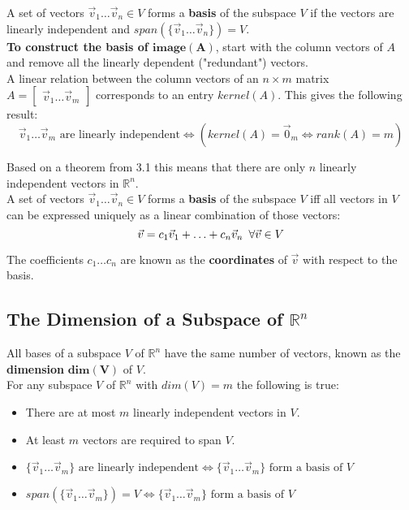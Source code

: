 \documentclass[]{scrartcl}
\begin{document}
	A set of vectors $\vec{v}_1 \ldots \vec{v}_n \in V$ forms a \textbf{basis} of the subspace $V$ if the vectors are linearly independent and $span(\{\vec{v}_1 \ldots \vec{v}_n\}) = V$.\\
	
	\textbf{To construct the basis of $\boldsymbol{image(A)}$}, start with the column vectors of $A$ and remove all the linearly dependent ("redundant") vectors.\\
	
	A linear relation between the column vectors of an $n \times m$ matrix $A=\begin{bmatrix}\vec{v}_1 \ldots \vec{v}_m\end{bmatrix}$ corresponds to an entry $kernel(A)$. This gives the following result:
	$$
	\vec{v}_1 \ldots \vec{v}_m \text{ are linearly independent} \iff (kernel(A)=\vec{0}_m \iff rank(A)=m)
	$$
	
	Based on a theorem from 3.1 this means that there are only $n$ linearly independent vectors in $\mathbb{R}^n$.\\
	
	A set of vectors $\vec{v}_1 \ldots \vec{v}_n \in V$ forms a \textbf{basis} of the subspace $V$ iff all vectors in $V$ can be expressed uniquely as a linear combination of those vectors:
	$$\vec{v} = c_1\vec{v}_1 + \ldots + c_n\vec{v}_n \enskip \forall \vec{v} \in V$$
	
	The coefficients $c_1 \ldots c_n$ are known as the \textbf{coordinates} of $\vec{v}$ with respect to the basis.
	
	\subsection{The Dimension of a Subspace of $\mathbb{R}^n$}
	
	All bases of a subspace $V$ of $\mathbb{R}^n$ have the same number of vectors, known as the \textbf{dimension} $\boldsymbol{dim(V)}$ of $V$.\\
	
	For any subspace $V$ of $\mathbb{R}^n$ with $dim(V)=m$ the following is true:
	\begin{itemize}
		\item There are at most $m$ linearly independent vectors in $V$.
		\item At least $m$ vectors are required to span $V$.
		\item $ \{\vec{v}_1 \ldots \vec{v}_m\} \text{ are linearly independent} \iff \{\vec{v}_1 \ldots \vec{v}_m\} \text{ form a basis of } V$
		\item $ span(\{\vec{v}_1 \ldots \vec{v}_m\}) = V \iff \{\vec{v}_1 \ldots \vec{v}_m\} \text{ form a basis of } V$
	\end{itemize}
\end{document}
